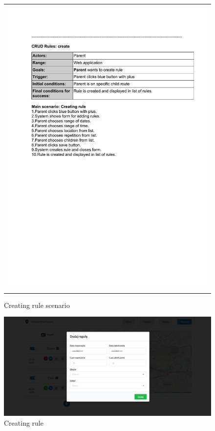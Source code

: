 \documentclass{sprawozdanie-agh}
\begin{document}
    	\begin{figure}[H]
    		\centering
    		\begin{tabular}{c}
    			\includegraphics[width=.80\textwidth]{crR_cropped}
    		\end{tabular}
    		\caption{Creating rule scenario}
    	\end{figure}

    	\begin{figure}[H]
    		\centering
    		\includegraphics[width=.80\textwidth]{addRule}
    		\caption{Creating rule}
    	\end{figure}
\end{document}

